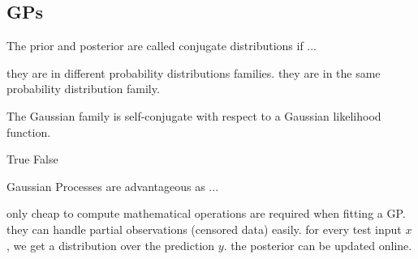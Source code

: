 \documentclass{exam}
\begin{document}
\begin{questions}
		
		\clearpage
		\section{GPs}
		\question The prior and posterior are called conjugate distributions if ...
		\begin{choices}
			\choice they are in different probability distributions families.
			\choice they are in the same probability distribution family. %
		\end{choices}
		
		\question The Gaussian family is self-conjugate with respect to a Gaussian likelihood function.
		\begin{choices}
			\choice True %
			\choice False
		\end{choices}
		
		\question Gaussian Processes are advantageous as ...
		\begin{choices}
			\choice only cheap to compute mathematical operations are required when fitting a GP.
			\choice they can handle partial observations (censored data) easily.
			\choice for every test input $x$ , we get a distribution over the prediction $y$. %
			\choice the posterior can be updated online. %
		\end{choices}
		

\end{questions}
\end{document}
